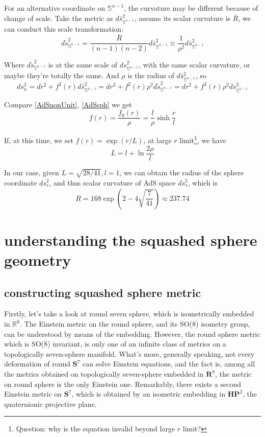 \documentclass[12pt, a4paper]{article}
\numberwithin{equation}{section}
\newcommand{\be}{\begin{equation}}
\newcommand{\ee}{\end{equation}}
\begin{document}
	For an alternative coordinate on $\mathbb{S}^{n-1}$, the curvature may be different because of change of scale. Take the metric as $d\bar{s}_{\mathbb{S}^{n-1}}^2$, assume its scalar curvature is $\bar{R}$, we can conduct this scale transformation:
\be
	d\tilde{s}_{\mathbb{S}^{n-1}}^2 = \frac{\bar{R}}{(n-1)(n-2)}d\bar{s}_{\mathbb{S}^{n-1}}^2 \equiv \frac{1}{\rho^2}d\bar{s}_{\mathbb{S}^{n-1}}^2
\ee

	Where $d\tilde{s}_{\mathbb{S}^{n-1}}^2$ is at the same scale of $ds_{\mathbb{S}^{n-1}}^2$, with the same scalar curvature, or maybe they're totally the same. And $\rho$ is the radius of $d\bar{s}_{\mathbb{S}^{n-1}}^2$, so
\be
	ds_n^2 = dr^2 + f^2(r) d\bar{s}_{\mathbb{S}^{n-1}}^2 = dr^2 + f^2(r) \rho^2 	d\tilde{s}_{\mathbb{S}^{n-1}}^2 = dr^2 + f^2(r) \rho^2 	ds_{\mathbb{S}^{n-1}}^2 
	\label{AdSnonUnit}
\ee

	Compare \ref{AdSnonUnit}, \ref{AdSsph} we get
\be
	f(r) = \frac{f_0(r)}{\rho} = \frac{l}{\rho}\sinh\frac{r}{l}
\ee

	If, at this time, we set $f(r) = \exp(r/L)$, at large $r$ limit\footnote{Question: why is the equation invalid beyond large $r$ limit?}, we have
\be
	L = l + \ln\frac{2\rho}{l}
\ee
	
	In our case, given $L = \sqrt{28/41}, l = 1$, we can obtain the radius of the sphere coordinate $ds_*^2$, and thus scalar curvature of AdS space $ds_*^2$, which is
\be	
	R = 168\exp(2-4\sqrt{\frac{7}{41}}) \approx 237.74
\ee

\section{understanding the squashed sphere geometry}

\subsection{constructing squashed sphere metric}

	Firstly, let's take a look at round seven sphere, which is isometrically embedded in $\mathbb{R}^8$. The Einstein metric on the round sphere, and its SO(8) isometry group, can be understood by means of the embedding. However, the round sphere metric which is SO(8) invariant, is only one of an infinite class of metrics on a topologically seven-sphere manifold. What's more, generally speaking, not every deformation of round $\mathbf{S}^7$ can solve Einstein equations, and the fact is, among all the metrics obtained on topologically seven-sphere embedded in $\mathbf{R}^8$, the metric on round sphere is the only Einstein one. Remarkably, there exists a second Einstein metric on $\mathbf{S}^7$, which is obtained by an isometric embedding in $\mathbf{HP}^2$, the quaternionic projective plane.
	
\end{document}
